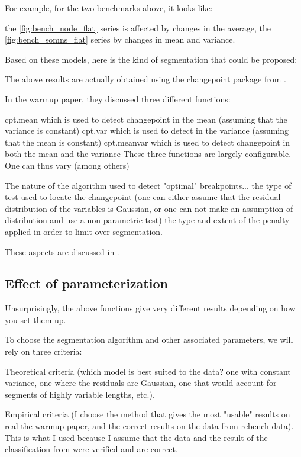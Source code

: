 \documentclass{article}
\begin{document}
For example, for the two benchmarks above, it looks like:

the \ref{fig:bench_node_flat} series is affected by changes in the average,
the \ref{fig:bench_somns_flat} series by changes in mean and variance.


Based on these models, here is the kind of segmentation that could be proposed:

The above results are actually obtained using the changepoint package from \citep{killick2014changepoint}.

In the warmup paper, they discussed three different functions:

cpt.mean which is used to detect changepoint in the mean (assuming that the variance is constant)
cpt.var which is used to detect  in the variance (assuming that the mean is constant)
cpt.meanvar which is used to detect changepoint in both the mean and the variance
These three functions are largely configurable. One can thus vary (among others)

The nature of the algorithm used to detect "optimal" breakpoints...
the type of test used to locate the changepoint (one can either assume that the residual distribution of the variables is Gaussian, or one can not make an assumption of distribution and use a non-parametric test)
the type and extent of the penalty applied in order to limit over-segmentation.

These aspects are discussed in \citep{killick2014changepoint}.

\subsection{Effect of parameterization}

Unsurprisingly, the above functions give very different results depending on how you set them up.

To choose the segmentation algorithm and other associated parameters, we will rely on three criteria:

Theoretical criteria (which model is best suited to the data? one with constant variance, one where the residuals are Gaussian, one that would account for segments of highly variable lengths, etc.).

Empirical criteria (I choose the method that gives the most "usable" results on real the warmup paper, and the correct results on the data from rebench data). This is what I used because I assume that the data and the result of the classification from \citep{barrett2017virtual} were verified and are correct.
\end{document}
